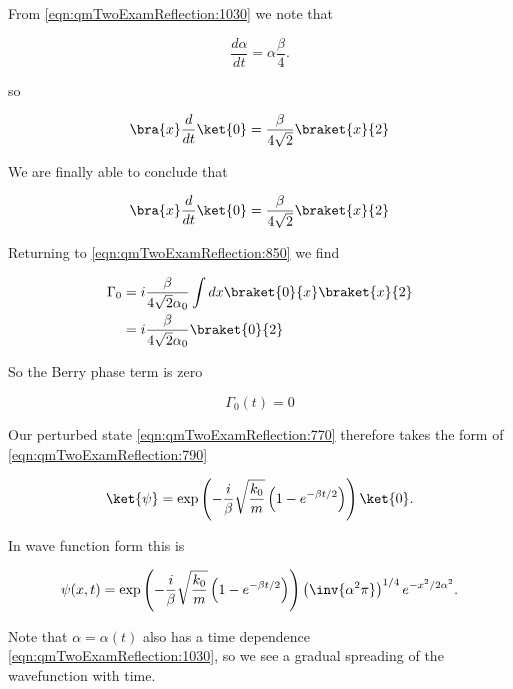 From \ref{eqn:qmTwoExamReflection:1030} we note that

\begin{equation}\label{eqn:qmTwoExamReflection:870}
\frac{d\alpha}{dt} = \alpha \frac{\beta}{4}.
\end{equation}

so

\begin{equation}\label{eqn:qmTwoExamReflection:1050}
\bra{x} \frac{d}{dt} \ket{0} 
=
\frac{\beta}{4 \sqrt{2}} 
\braket{x}{2} 
\end{equation}

We are finally able to conclude that

\begin{equation}\label{eqn:qmTwoExamReflection:910}
\bra{x} \frac{d}{dt} \ket{0} 
=
\frac{\beta}{4 \sqrt{2}} 
\braket{x}{2}
\end{equation}

Returning to \ref{eqn:qmTwoExamReflection:850} we find

\begin{align*}
\Gamma_0 &= 
i 
\frac{\beta}{4 \sqrt{2} \alpha_0} 
\int dx \braket{0}{x}
\braket{x}{2} \\
&= 
i 
\frac{\beta}{4 \sqrt{2} \alpha_0} 
\braket{0}{2}
\end{align*}

So the Berry phase term is zero

\begin{equation}\label{eqn:qmTwoExamReflection:930}
\Gamma_0(t) = 0
\end{equation}

Our perturbed state \ref{eqn:qmTwoExamReflection:770} therefore takes the form of \ref{eqn:qmTwoExamReflection:790} 

\begin{equation}\label{eqn:qmTwoExamReflection:950}
\ket{\psi} =
\exp\left(
- \frac{i}{\beta} \sqrt{\frac{k_0}{m}} 
\left( 1 - e^{-\beta t/2} \right)
\right) \ket{0}.
\end{equation}

In wave function form this is

\begin{equation}\label{eqn:qmTwoExamReflection:970}
\psi(x, t)
=
\exp\left(
- \frac{i}{\beta} \sqrt{\frac{k_0}{m}} 
\left( 1 - e^{-\beta t/2} \right)
\right) 
\left(\inv{\alpha^2\pi}\right)^{1/4} e^{- x^2/2 \alpha^2}.
\end{equation}

Note that $\alpha = \alpha(t)$ also has a time dependence \ref{eqn:qmTwoExamReflection:1030}, so we see a gradual spreading of the wavefunction with time.


